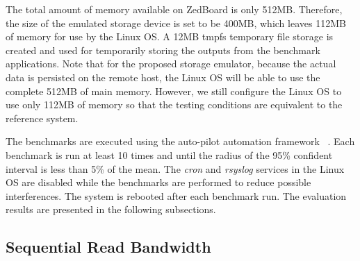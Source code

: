 The total amount of memory available on ZedBoard is only 512MB. Therefore, the size of the emulated storage device is set to be 400MB, which leaves 112MB of memory for use by the Linux OS. A 12MB tmpfs temporary file storage is created and used for temporarily storing the outputs from the benchmark applications. Note that for the proposed storage emulator, because the actual data is persisted on the remote host, the Linux OS will be able to use the complete 512MB of main memory. However, we still configure the Linux OS to use only 112MB of memory so that the testing conditions are equivalent to the reference system.

The benchmarks are executed using the auto-pilot automation framework~\cite{Wright:2005:auto-pilot} \cite{Wright:2007:auto-pilot}. Each benchmark is run at least 10 times and until the radius of the 95\% confident interval is less than 5\% of the mean. The \textit{cron} and \textit{rsyslog} services in the Linux OS are disabled while the benchmarks are performed to reduce possible interferences. The system is rebooted after each benchmark run. The evaluation results are presented in the following subsections.
	
\subsection{Sequential Read Bandwidth}
\label{sec:ch6-6.6.1}

